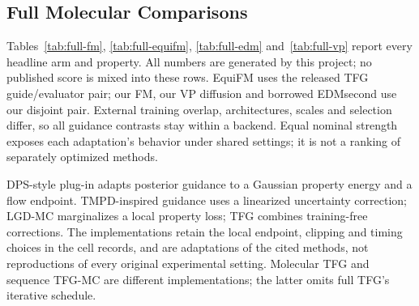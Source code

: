 \documentclass{article}
\begin{document}
\subsection{Full Molecular Comparisons}\label{app:comparisons}
Tables~\ref{tab:full-fm}, \ref{tab:full-equifm}, \ref{tab:full-edm} and~\ref{tab:full-vp} report every headline arm and property. All numbers are generated by this project; no published score is mixed into these rows. EquiFM uses the released TFG guide/evaluator pair; our FM, our VP diffusion and borrowed EDMsecond use our disjoint pair. External training overlap, architectures, scales and selection differ, so all guidance contrasts stay within a backend. Equal nominal strength exposes each adaptation's behavior under shared settings; it is not a ranking of separately optimized methods.

DPS-style plug-in adapts posterior guidance to a Gaussian property energy and a flow endpoint. TMPD-inspired guidance uses a linearized uncertainty correction; LGD-MC marginalizes a local property loss; TFG combines training-free corrections. The implementations retain the local endpoint, clipping and timing choices in the cell records, and are adaptations of the cited methods, not reproductions of every original experimental setting. Molecular TFG and sequence TFG-MC are different implementations; the latter omits full TFG's iterative schedule.
\end{document}
